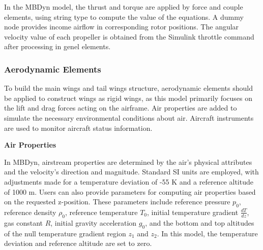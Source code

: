 In the MBDyn model, the thrust and torque are applied by force and couple elements, using string type to compute the value of the equations. A dummy node provides income airflow in corresponding rotor positions. The angular velocity value of each propeller is obtained from the Simulink throttle command after processing in genel elements.

\subsubsection{Aerodynamic Elements}
\label{section:Aerodynamic elements}

To build the main wings and tail wings structure, aerodynamic elements should be applied to construct wings as rigid wings, as this model primarily focuses on the lift and drag forces acting on the airframe. Air properties are added to simulate the necessary environmental conditions about air. Aircraft instruments are used to monitor aircraft status information.

\textbf{Air Properties}

In MBDyn, airstream properties are determined by the air's physical attributes and the velocity's direction and magnitude. Standard SI units are employed, with adjustments made for a temperature deviation of -55 K and a reference altitude of 1000 m. Users can also provide parameters for computing air properties based on the requested z-position. These parameters include reference pressure $p_0$, reference density $\rho_0$, reference temperature $T_0$, initial temperature gradient $\frac{dT}{dz}$, gas constant $R$, initial gravity acceleration $g_0$, and the bottom and top altitudes of the null temperature gradient region $z_1$ and $z_2$. In this model, the temperature deviation and reference altitude are set to zero.

